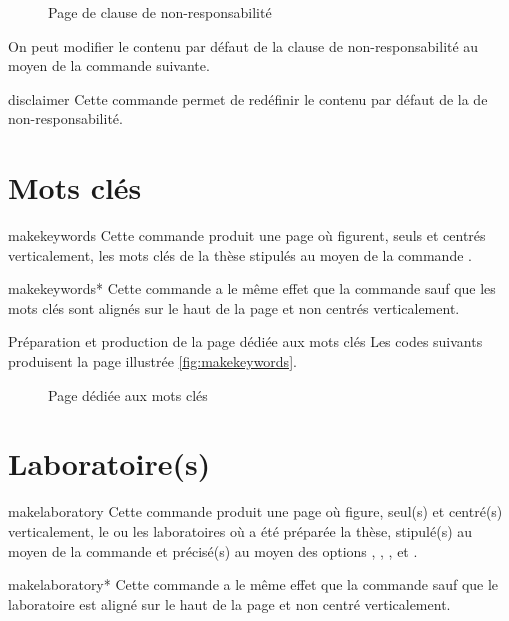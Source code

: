 \begin{figure}[htbp]
  \centering
  \caption{Page de clause de non-responsabilité}
  \label{fig:disclaimerpage}
\end{figure}

On peut modifier le contenu par défaut de la clause de non-responsabilité au
moyen de la commande  suivante.

\begin{docCommand}{disclaimer}{}
  Cette commande permet de redéfinir le contenu par défaut de la
   de non-responsabilité.
\end{docCommand}

\section{Mots clés}\label{sec:mots-cles}

\begin{docCommand}{makekeywords}{}
  Cette commande produit une page où figurent, seuls et centrés
  verticalement, les mots clés de la thèse stipulés au moyen de la commande
  .
\end{docCommand}
%
\begin{docCommand}{makekeywords*}{}
  Cette commande a le même effet que la commande
   sauf que les mots clés sont alignés sur le haut de la
  page et non centrés verticalement.
\end{docCommand}

\begin{dbexample}{Préparation et production de la page dédiée aux mots clés}{}
  Les codes suivants produisent la page illustrée \vref{fig:makekeywords}.
%
\end{dbexample}

\begin{figure}[htbp]
  \centering {}%
  \caption{Page dédiée aux mots clés}
  \label{fig:makekeywords}
\end{figure}

\section{Laboratoire(s)}
\label{sec:laboratoires}

\begin{docCommand}{makelaboratory}{}
  Cette commande produit une page où figure, seul(s) et centré(s)
  verticalement, le ou les laboratoires où a été préparée la thèse, stipulé(s)
  au moyen de la commande  et précisé(s) au moyen des
  options , , , 
  et .
\end{docCommand}
%
\begin{docCommand}{makelaboratory*}{}
  Cette commande a le même effet que la commande
   sauf que le laboratoire est aligné sur le haut de la
  page et non centré verticalement.
\end{docCommand}

